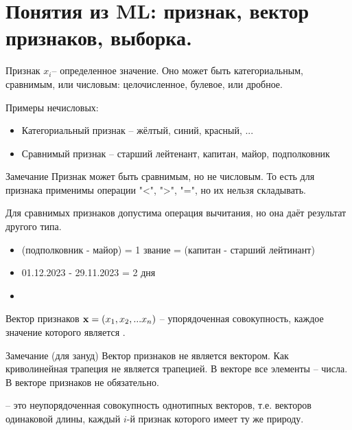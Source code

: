 \section{Понятия из ML: признак, вектор признаков, выборка.}\label{section:ml_defs}

 \begin{frame}{Признак}
 	\footnotesize
	 $x_i$-- определенное значение. 
	Оно может быть категориальным, сравнимым, или числовым: целочисленное, булевое, или дробное.
	
	Примеры нечисловых:
	\begin{itemize}
		\item Категориальный признак -- жёлтый, синий, красный, ...
		\item Сравнимый признак -- старший лейтенант, капитан, майор, подполковник
	\end{itemize}
	\begin{block}{Замечание}
		Признак может быть сравнимым, но не числовым. 
		То есть для признака применимы операции "<", ">", "=", но их нельзя складывать.
		
		Для сравнимых признаков допустима операция вычитания, но она даёт результат другого типа.
		\begin{itemize}
			\item (подполковник - майор) = 1 звание = (капитан - старший лейтинант)
			\item 01.12.2023 - 29.11.2023 = 2 дня
			\item {}
		\end{itemize}
	\end{block}

\end{frame}

\begin{frame}{Вектор признаков}
	 $\bold x = (x_1, x_2, ... x_n)$ -- упорядоченная совокупность, каждое значение которого является . 
	
	\begin{block}{Замечание (для зануд)}
		Вектор признаков не является вектором. Как криволинейная трапеция не является трапецией.	
		В векторе все элементы -- числа. В векторе признаков не обязательно.
	\end{block}

	 -- это неупорядоченная совокупность однотипных векторов, 
	т.е. векторов одинаковой длины, каждый $i$-й признак которого имеет ту же природу.
\end{frame}

